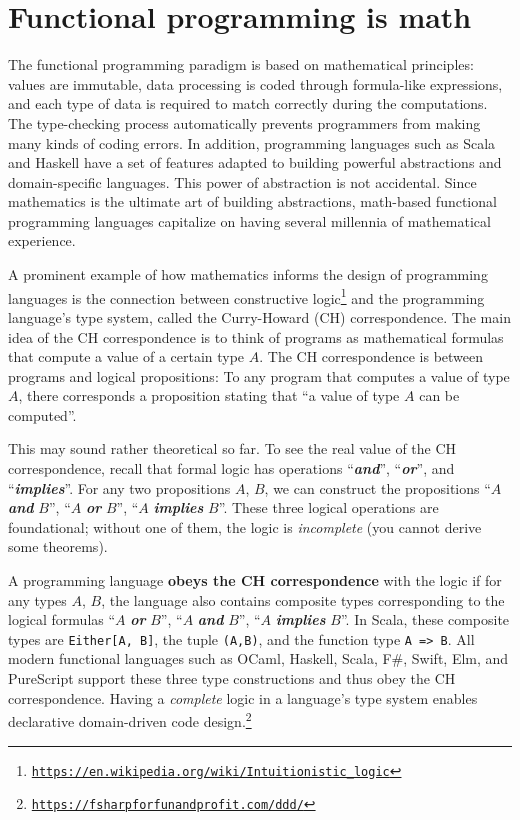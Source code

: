 \section{Functional programming is math}

The functional programming paradigm is based on mathematical principles:
values are immutable, data processing is coded through formula-like
expressions, and each type of data is required to match correctly
during the computations. The type-checking process automatically prevents
programmers from making many kinds of coding errors. In addition,
programming languages such as Scala and Haskell have a set of features
adapted to building powerful abstractions and domain-specific languages.
This power of abstraction is not accidental. Since mathematics is
the ultimate art of building abstractions, math-based functional programming
languages capitalize on having several millennia of mathematical experience.

A prominent example of how mathematics informs the design of programming
languages is the connection between constructive logic\footnote{\texttt{\href{https://en.wikipedia.org/wiki/Intuitionistic_logic}{https://en.wikipedia.org/wiki/Intuitionistic\_logic}}}
and the programming language\textsf{'}s type system, called the Curry-Howard
(CH) correspondence. The main idea of the CH correspondence
is to think of programs as mathematical formulas that compute a value
of a certain type $A$. The CH correspondence is between programs
and logical propositions: To any program that computes a value of
type $A$, there corresponds a proposition stating that \textsf{``}a value
of type $A$ can be computed\textsf{''}.

This may sound rather theoretical so far. To see the real value of
the CH correspondence, recall that formal logic has operations \textsf{``}\textbf{\emph{and}}\textsf{''},
\textsf{``}\textbf{\emph{or}}\textsf{''}, and \textsf{``}\textbf{\emph{implies}}\textsf{''}. For any
two propositions $A$, $B$, we can construct the propositions \textsf{``}$A$
\textbf{\emph{and}} $B$\textsf{''}, \textsf{``}$A$ \textbf{\emph{or}} $B$\textsf{''}, \textsf{``}$A$
\textbf{\emph{implies}} $B$\textsf{''}. These three logical operations are
foundational; without one of them, the logic is \emph{incomplete}
(you cannot derive some theorems).

A programming language \textbf{obeys the CH correspondence}
with the logic if for any types $A$, $B$, the language also contains
composite types corresponding to the logical formulas \textsf{``}$A$ \textbf{\emph{or}}
$B$\textsf{''}, \textsf{``}$A$ \textbf{\emph{and}} $B$\textsf{''}, \textsf{``}$A$ \textbf{\emph{implies}}
$B$\textsf{''}. In Scala, these composite types are \lstinline!Either[A, B]!,
the tuple \lstinline!(A,B)!, and the function type \lstinline!A => B!.
All modern functional languages such as OCaml, Haskell, Scala, F\#,
Swift, Elm, and PureScript support these three type constructions
and thus obey the CH correspondence. Having a \emph{complete} logic
in a language\textsf{'}s type system enables declarative domain-driven code
design.\footnote{\texttt{\href{https://fsharpforfunandprofit.com/ddd/}{https://fsharpforfunandprofit.com/ddd/}}}

